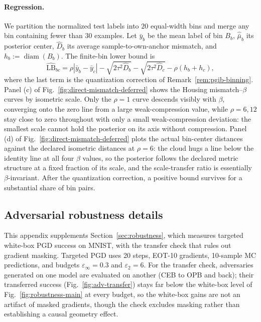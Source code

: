\paragraph{Regression.} We partition the normalized test labels into $20$
equal-width bins and merge any bin containing fewer than $30$ examples. Let
$\bar y_b$ be the mean label of bin $B_b$, $\widehat{\bar\mu}_b$ its posterior center,
$\widehat D_b$ its average sample-to-own-anchor mismatch, and
$h_b:=\operatorname{diam}(B_b)$. The finite-bin lower bound is
\begin{equation}
\widehat{\mathrm{LB}}_{bc}
=\rho|\bar y_b-\bar y_c|
-\sqrt{2\tau^2\widehat D_b}
-\sqrt{2\tau^2\widehat D_c}
-\rho(h_b+h_c),
\label{eq:empirical-regression-separation-bound}
\end{equation}
where the last term is the quantization correction of
Remark~\ref{rem:pgib-binning}. Panel (c) of Fig.~\ref{fig:direct-mismatch-deferred}
shows the Housing mismatch--$\beta$ curves by isometric scale. Only the $\rho=1$
curve descends visibly with $\beta$, converging onto the zero line from a large
weak-compression value, while $\rho=6,12$ stay close to zero throughout with only
a small weak-compression deviation: the smallest scale cannot hold the posterior
on its axis without compression. Panel (d) of
Fig.~\ref{fig:direct-mismatch-deferred}
plots the actual bin-center distances against the declared isometric distances at
$\rho=6$: the cloud hugs a line below the identity line at
all four $\beta$ values, so the posterior follows the declared metric structure at
a fixed fraction of its scale, and the scale-transfer ratio is essentially
$\beta$-invariant. After the quantization correction, a positive bound survives
for a substantial share of bin pairs.

\subsection{Adversarial robustness details}
\label{app:robustness}
This appendix supplements Section~\ref{sec:robustness}, which measures targeted
white-box PGD success on MNIST, with the transfer check that rules out gradient
masking. Targeted PGD uses 20 steps, EOT-10 gradients, 10-sample MC predictions,
and budgets $\varepsilon_\infty=0.3$ and $\varepsilon_2=6$. For the transfer
check, adversaries generated on one model are evaluated on another (CEB to OPB
and back); their transferred success (Fig.~\ref{fig:adv-transfer}) stays far
below the white-box level of Fig.~\ref{fig:robustness-main} at every budget, so
the white-box gains are not an artifact of masked gradients, though the check
excludes masking rather than establishing a causal geometry effect.

